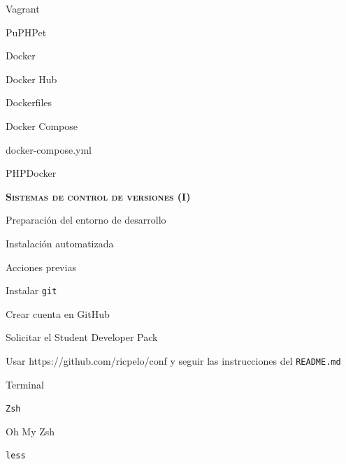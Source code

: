 \begin{longenum}
    \begin{longenum}
        \item Vagrant
        \begin{longenum}
            \item PuPHPet
        \end{longenum}
        \item Docker
        \begin{longenum}
            \item Docker Hub
            \item Dockerfiles
            \item Docker Compose
            \begin{longenum}
                \item docker-compose.yml
            \end{longenum}
        \end{longenum}
        \item PHPDocker
    \end{longenum}
    \item \textbf{\textsc{Sistemas de control de versiones (I)}} \ \ \ \ \ \
    \begin{longenum}
        \item Preparación del entorno de desarrollo
        \begin{longenum}
            \item Instalación automatizada
            \begin{longenum}
                \item Acciones previas
                \begin{longenum}
                    \item Instalar \texttt{git}
                    \item Crear cuenta en GitHub
                    \item Solicitar el Student Developer Pack
                \end{longenum}
                \item Usar https://github.com/ricpelo/conf y seguir las instrucciones del \texttt{README.md}
            \end{longenum}
            \item Terminal
            \begin{longenum}
                \item \texttt{Zsh}
                \item Oh My Zsh
                \item \texttt{less}

\end{longenum}
\end{longenum}
\end{longenum}
\end{longenum}
